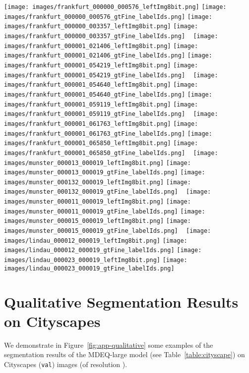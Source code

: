 \documentclass{article}
\begin{document}
\begin{figure*}[t]
  \centering
  \texttt{[image: images/frankfurt\_000000\_000576\_leftImg8bit.png]}
  \texttt{[image: images/frankfurt\_000000\_000576\_gtFine\_labelIds.png]}
  \texttt{[image: images/frankfurt\_000000\_003357\_leftImg8bit.png]}
  \texttt{[image: images/frankfurt\_000000\_003357\_gtFine\_labelIds.png]}
  ~
  \texttt{[image: images/frankfurt\_000001\_021406\_leftImg8bit.png]}
  \texttt{[image: images/frankfurt\_000001\_021406\_gtFine\_labelIds.png]}
  \texttt{[image: images/frankfurt\_000001\_054219\_leftImg8bit.png]}
  \texttt{[image: images/frankfurt\_000001\_054219\_gtFine\_labelIds.png]}
  ~
  \texttt{[image: images/frankfurt\_000001\_054640\_leftImg8bit.png]}
  \texttt{[image: images/frankfurt\_000001\_054640\_gtFine\_labelIds.png]}
  \texttt{[image: images/frankfurt\_000001\_059119\_leftImg8bit.png]}
  \texttt{[image: images/frankfurt\_000001\_059119\_gtFine\_labelIds.png]}
  ~
  \texttt{[image: images/frankfurt\_000001\_061763\_leftImg8bit.png]}
  \texttt{[image: images/frankfurt\_000001\_061763\_gtFine\_labelIds.png]}
  \texttt{[image: images/frankfurt\_000001\_065850\_leftImg8bit.png]}
  \texttt{[image: images/frankfurt\_000001\_065850\_gtFine\_labelIds.png]}
  ~
  \texttt{[image: images/munster\_000013\_000019\_leftImg8bit.png]}
  \texttt{[image: images/munster\_000013\_000019\_gtFine\_labelIds.png]}
  \texttt{[image: images/munster\_000132\_000019\_leftImg8bit.png]}
  \texttt{[image: images/munster\_000132\_000019\_gtFine\_labelIds.png]}
  ~
  \texttt{[image: images/munster\_000011\_000019\_leftImg8bit.png]}
  \texttt{[image: images/munster\_000011\_000019\_gtFine\_labelIds.png]}
  \texttt{[image: images/munster\_000015\_000019\_leftImg8bit.png]}
  \texttt{[image: images/munster\_000015\_000019\_gtFine\_labelIds.png]}
  ~
  \texttt{[image: images/lindau\_000012\_000019\_leftImg8bit.png]}
  \texttt{[image: images/lindau\_000012\_000019\_gtFine\_labelIds.png]}
  \texttt{[image: images/lindau\_000023\_000019\_leftImg8bit.png]}
  \texttt{[image: images/lindau\_000023\_000019\_gtFine\_labelIds.png]}

  \caption{Examples of MDEQ-large segmentation results on the Cityscapes dataset.}
  \label{fig:app-qualitative}
\end{figure*}

\section{Qualitative Segmentation Results on Cityscapes}
\label{app:qual}

We demonstrate in Figure~\ref{fig:app-qualitative} some examples of the segmentation results of the MDEQ-large model (see Table~\ref{table:cityscape}) on Cityscapes (\texttt{val}) images (of resolution ).

\vspace{.1in}
\end{document}

